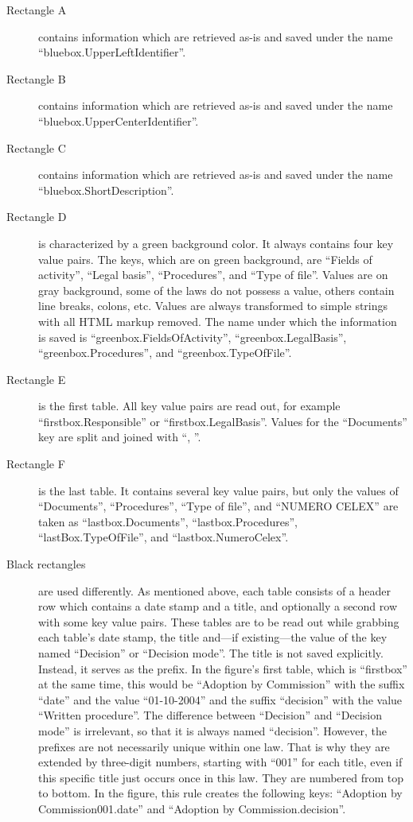 \documentclass{scrartcl}
\begin{document}
\label{sec:numberingschema}
\begin{description}
\item[Rectangle A] contains information which are retrieved as-is and saved under the name ``bluebox.UpperLeftIdentifier''.
\item[Rectangle B] contains information which are retrieved as-is and saved under the name ``bluebox.UpperCenterIdentifier''.
\item[Rectangle C] contains information which are retrieved as-is and saved under the name ``bluebox.ShortDescription''.
\item[Rectangle D] is characterized by a green background color. It always contains four key value pairs. The keys, which are on green background, are ``Fields of activity'', ``Legal basis'', ``Procedures'', and ``Type of file''. Values are on gray background, some of the laws do not possess a value, others contain line breaks, colons, etc. Values are always transformed to simple strings with all HTML markup removed. The name under which the information is saved is ``greenbox.FieldsOfActivity'', ``greenbox.LegalBasis'', ``greenbox.Procedures'', and ``greenbox.TypeOfFile''.
\item[Rectangle E] is the first table. All key value pairs are read out, for example ``firstbox.Responsible'' or ``firstbox.LegalBasis''. Values for the ``Documents'' key are split and joined with ``, ''.
\item[Rectangle F] is the last table. It contains several key value pairs, but only the values of ``Documents'', ``Procedures'', ``Type of file'', and ``NUMERO CELEX'' are taken as ``lastbox.Documents'', ``lastbox.Procedures'', ``lastBox.TypeOfFile'', and ``lastbox.NumeroCelex''.
\item[Black rectangles] are used differently. As mentioned above, each table consists of a header row which contains a date stamp and a title, and optionally a second row with some key value pairs. These tables are to be read out while grabbing each table's date stamp, the title and---if existing---the value of the key named ``Decision'' or ``Decision mode''. The title is not saved explicitly. Instead, it serves as the prefix. In the figure's first table, which is ``firstbox'' at the same time, this would be ``Adoption by Commission'' with the suffix ``date'' and the value ``01-10-2004'' and the suffix ``decision'' with the value ``Written procedure''. The difference between ``Decision'' and ``Decision mode'' is irrelevant, so that it is always named ``decision''. However, the prefixes are not necessarily unique within one law. That is why they are extended by three-digit numbers, starting with ``001'' for each title, even if this specific title just occurs once in this law. They are numbered from top to bottom. In the figure, this rule creates the following keys: ``Adoption by Commission001.date'' and ``Adoption by Commission.decision''.

\end{description}
\end{document}
